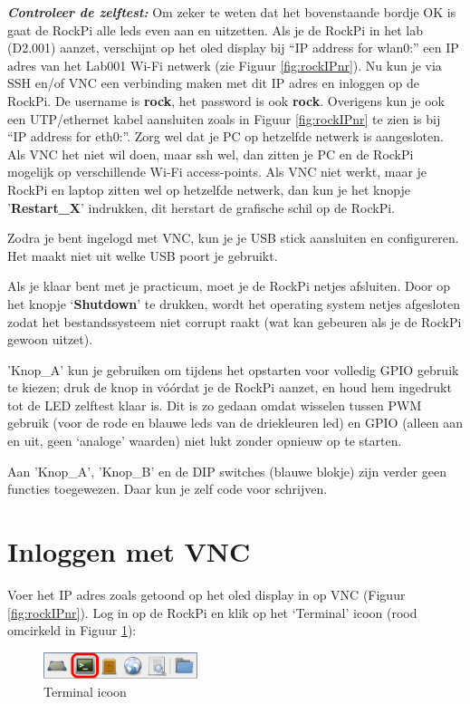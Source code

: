 \textbf{\textit{Controleer de zelftest:}} Om zeker te weten dat het bovenstaande bordje OK is gaat de RockPi alle leds even aan en uitzetten. \newline
Als je de RockPi in het lab (D2.001) aanzet, verschijnt op het oled display bij “IP address for wlan0:” een IP adres van het Lab001 Wi-Fi netwerk (zie Figuur \ref{fig:rockIPnr}). \newline
Nu kun je via SSH en/of VNC een verbinding maken met dit IP adres en inloggen op de RockPi.
De username is \textbf{rock}, het password is ook \textbf{rock}. 
Overigens kun je ook een UTP/ethernet kabel aansluiten zoals in Figuur \ref{fig:rockIPnr} te zien is bij “IP address for eth0:”.\break\newline
Zorg wel dat je PC op hetzelfde netwerk is aangesloten. Als VNC het niet wil doen, maar ssh wel, dan zitten je PC en de RockPi mogelijk op verschillende Wi-Fi access-points. Als VNC niet werkt, maar je RockPi en laptop zitten wel op hetzelfde netwerk, dan kun je het knopje '\textbf{Restart\_X}' indrukken, dit herstart de grafische schil op de RockPi.

Zodra je bent ingelogd met VNC, kun je je USB stick aansluiten en configureren. Het maakt niet uit welke USB poort je gebruikt. 

Als je klaar bent met je practicum, moet je de RockPi netjes afsluiten. Door op het knopje ‘\textbf{Shutdown}’ te drukken, wordt het operating system netjes afgesloten zodat het bestandssysteem niet corrupt raakt (wat kan gebeuren als je de RockPi gewoon uitzet).

'Knop\_A' kun je gebruiken om tijdens het opstarten voor volledig GPIO gebruik te kiezen; druk de knop in vóórdat je de RockPi aanzet, en houd hem ingedrukt tot de LED zelftest klaar is. Dit is zo gedaan omdat wisselen tussen PWM gebruik (voor de rode en blauwe leds van de driekleuren led) en GPIO (alleen aan en uit, geen ‘analoge’ waarden) niet lukt zonder opnieuw op te starten.

Aan 'Knop\_A', 'Knop\_B' en de DIP switches (blauwe blokje) zijn verder geen functies toegewezen. Daar kun je zelf code voor schrijven.

\section{Inloggen met VNC}
Voer het IP adres zoals getoond op het oled display in op VNC (Figuur \ref{fig:rockIPnr}).\newline
Log in op de RockPi en klik op het ‘Terminal’ icoon (rood omcirkeld in Figuur \ref{fig:termico}):
\begin{figure}[h!]
	\centering
	\begin{center} 	
		\includegraphics[width=0.4\textwidth]{figuren/Terminal-icoon}
		\caption{Terminal icoon}
		\label{fig:termico}   
	\end{center}
\end{figure}

